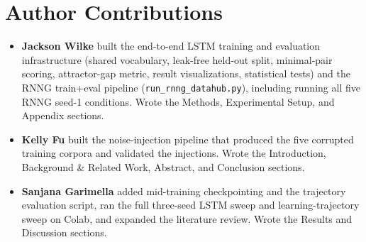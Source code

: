 \section*{Author Contributions}

\begin{itemize}
  \item \textbf{Jackson Wilke} built the end-to-end LSTM training and evaluation
    infrastructure (shared vocabulary, leak-free held-out split, minimal-pair
    scoring, attractor-gap metric, result visualizations, statistical tests) and
    the RNNG train+eval pipeline (\texttt{run\_rnng\_datahub.py}), including
    running all five RNNG seed-1 conditions.
    Wrote the Methods, Experimental Setup, and Appendix sections.
  \item \textbf{Kelly Fu} built the noise-injection pipeline that produced the
    five corrupted training corpora and validated the injections.
    Wrote the Introduction, Background \& Related Work, Abstract, and Conclusion
    sections.
  \item \textbf{Sanjana Garimella} added mid-training checkpointing and the
    trajectory evaluation script, ran the full three-seed LSTM sweep and
    learning-trajectory sweep on Colab, and expanded the literature review.
    Wrote the Results and Discussion sections.
\end{itemize}
